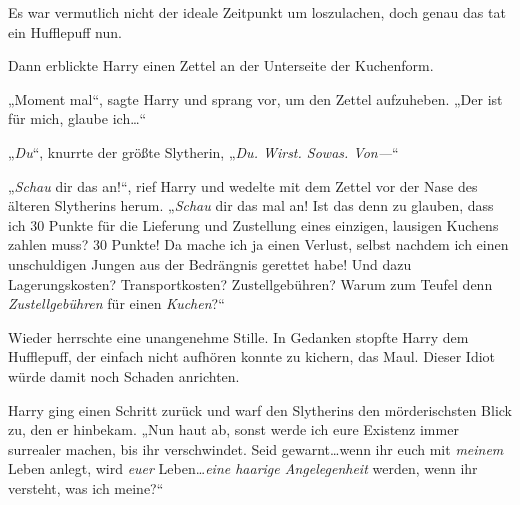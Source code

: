 Es war vermutlich nicht der ideale Zeitpunkt um loszulachen, doch genau das tat ein Hufflepuff nun.

Dann erblickte Harry einen Zettel an der Unterseite der Kuchenform.

„Moment mal“, sagte Harry und sprang vor, um den Zettel aufzuheben. „Der ist für mich, glaube ich…“

„\emph{Du}“, knurrte der größte Slytherin, „\emph{Du. Wirst. Sowas. Von—}“

„\emph{Schau} dir das an!“, rief Harry und wedelte mit dem Zettel vor der Nase des älteren Slytherins herum. „\emph{Schau} dir das mal an! Ist das denn zu glauben, dass ich 30 Punkte für die Lieferung und Zustellung eines einzigen, lausigen Kuchens zahlen muss? 30 Punkte! Da mache ich ja einen Verlust, selbst nachdem ich einen unschuldigen Jungen aus der Bedrängnis gerettet habe! Und dazu Lagerungskosten? Transportkosten? Zustellgebühren? Warum zum Teufel denn \emph{Zustellgebühren} für einen \emph{Kuchen}?“

Wieder herrschte eine unangenehme Stille. In Gedanken stopfte Harry dem Hufflepuff, der einfach nicht aufhören konnte zu kichern, das Maul. Dieser Idiot würde damit noch Schaden anrichten.

Harry ging einen Schritt zurück und warf den Slytherins den mörderischsten Blick zu, den er hinbekam. „Nun haut ab, sonst werde ich eure Existenz immer surrealer machen, bis ihr verschwindet. Seid gewarnt…wenn ihr euch mit \emph{meinem} Leben anlegt, wird \emph{euer} Leben…\emph{eine haarige Angelegenheit} werden, wenn ihr versteht, was ich meine?“

